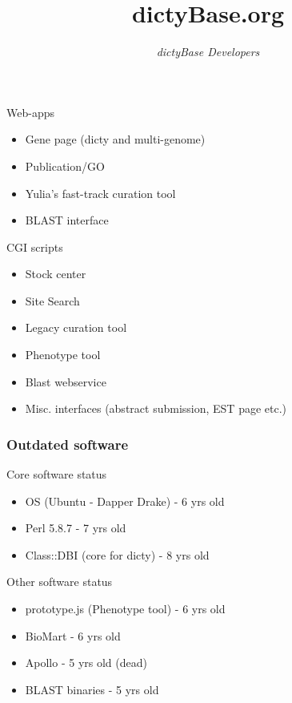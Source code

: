 \documentclass[hyperref={pdfpagelabels=false}, compress]{beamer}
\title{dictyBase.org}
\author{\textit{dictyBase Developers}}
\date
\begin{document}
\frame{\titlepage}



\section{}
\begin{frame}
	\frametitle{}
	\begin{block}{Web-apps}
		\begin{itemize}
			\item Gene page (dicty and multi-genome)
			\item Publication/GO
			\item Yulia's fast-track curation tool
			\item BLAST interface
		\end{itemize}
	\end{block}
	\begin{block}{CGI scripts}
		\begin{itemize}
			\item Stock center
    			\item Site Search
    			\item Legacy curation tool
    			\item Phenotype tool
    			\item Blast webservice
    			\item Misc. interfaces (abstract submission, EST page etc.)

		\end{itemize}
	\end{block}
\end{frame}

\begin{frame}
	\frametitle{Outdated software}
	\begin{block}{Core software status}
    		\begin{itemize}
			\item OS (Ubuntu - Dapper Drake) - 6 yrs old
			\item Perl 5.8.7 - 7 yrs old
			\item Class::DBI (core for dicty) - 8 yrs old
			\end{itemize}
	\end{block}
	\begin{block}{Other software status}
    		\begin{itemize}
			\item prototype.js (Phenotype tool) - 6 yrs old
    			\item BioMart - 6 yrs old
    			\item Apollo - 5 yrs old (dead)
    			\item BLAST binaries - 5 yrs old
		\end{itemize}
	\end{block}
\end{frame}
\end{document}

